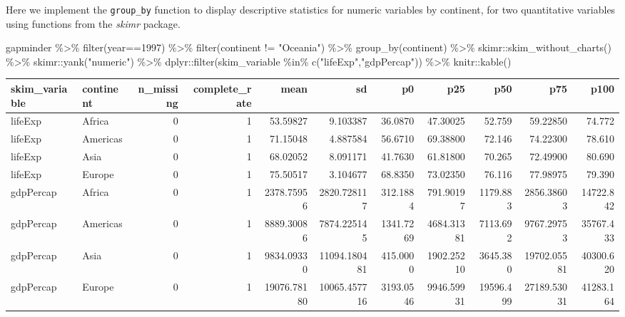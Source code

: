 \documentclass[
]{book}
\newenvironment{Shaded}{\begin{snugshade}}{\end{snugshade}}
\newcommand{\DecValTok}[1]{\textcolor[rgb]{0.00,0.00,0.81}{#1}}
\newcommand{\FunctionTok}[1]{\textcolor[rgb]{0.00,0.00,0.00}{#1}}
\newcommand{\NormalTok}[1]{#1}
\newcommand{\SpecialCharTok}[1]{\textcolor[rgb]{0.00,0.00,0.00}{#1}}
\newcommand{\StringTok}[1]{\textcolor[rgb]{0.31,0.60,0.02}{#1}}
\begin{document}
Here we implement the \texttt{group\_by} function to display descriptive statistics for numeric variables by continent, for two quantitative variables using functions from the \emph{skimr} package.

\begin{Shaded}
\begin{Highlighting}[]
\NormalTok{gapminder }\SpecialCharTok{\%\textgreater{}\%} \FunctionTok{filter}\NormalTok{(year}\SpecialCharTok{==}\DecValTok{1997}\NormalTok{) }\SpecialCharTok{\%\textgreater{}\%} 
  \FunctionTok{filter}\NormalTok{(continent }\SpecialCharTok{!=} \StringTok{"Oceania"}\NormalTok{) }\SpecialCharTok{\%\textgreater{}\%} 
  \FunctionTok{group\_by}\NormalTok{(continent) }\SpecialCharTok{\%\textgreater{}\%} 
\NormalTok{  skimr}\SpecialCharTok{::}\FunctionTok{skim\_without\_charts}\NormalTok{() }\SpecialCharTok{\%\textgreater{}\%}
\NormalTok{  skimr}\SpecialCharTok{::}\FunctionTok{yank}\NormalTok{(}\StringTok{"numeric"}\NormalTok{) }\SpecialCharTok{\%\textgreater{}\%}
\NormalTok{  dplyr}\SpecialCharTok{::}\FunctionTok{filter}\NormalTok{(skim\_variable }\SpecialCharTok{\%in\%} \FunctionTok{c}\NormalTok{(}\StringTok{"lifeExp"}\NormalTok{,}\StringTok{"gdpPercap"}\NormalTok{)) }\SpecialCharTok{\%\textgreater{}\%}
\NormalTok{  knitr}\SpecialCharTok{::}\FunctionTok{kable}\NormalTok{()}
\end{Highlighting}
\end{Shaded}

\begin{tabular}{l|l|r|r|r|r|r|r|r|r|r}
\hline
skim\_variable & continent & n\_missing & complete\_rate & mean & sd & p0 & p25 & p50 & p75 & p100\\
\hline
lifeExp & Africa & 0 & 1 & 53.59827 & 9.103387 & 36.0870 & 47.30025 & 52.759 & 59.22850 & 74.772\\
\hline
lifeExp & Americas & 0 & 1 & 71.15048 & 4.887584 & 56.6710 & 69.38800 & 72.146 & 74.22300 & 78.610\\
\hline
lifeExp & Asia & 0 & 1 & 68.02052 & 8.091171 & 41.7630 & 61.81800 & 70.265 & 72.49900 & 80.690\\
\hline
lifeExp & Europe & 0 & 1 & 75.50517 & 3.104677 & 68.8350 & 73.02350 & 76.116 & 77.98975 & 79.390\\
\hline
gdpPercap & Africa & 0 & 1 & 2378.75956 & 2820.728117 & 312.1884 & 791.90197 & 1179.883 & 2856.38603 & 14722.842\\
\hline
gdpPercap & Americas & 0 & 1 & 8889.30086 & 7874.225145 & 1341.7269 & 4684.31381 & 7113.692 & 9767.29753 & 35767.433\\
\hline
gdpPercap & Asia & 0 & 1 & 9834.09330 & 11094.180481 & 415.0000 & 1902.25210 & 3645.380 & 19702.05581 & 40300.620\\
\hline
gdpPercap & Europe & 0 & 1 & 19076.78180 & 10065.457716 & 3193.0546 & 9946.59931 & 19596.499 & 27189.53031 & 41283.164\\
\hline
\end{tabular}
\end{document}
